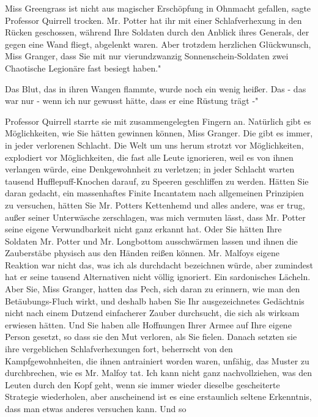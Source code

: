 \glqq Miss Greengrass ist nicht aus magischer Erschöpfung in Ohnmacht
gefallen\grqq{}, sagte Professor Quirrell trocken. \glqq Mr. Potter hat ihr mit
einer Schlafverhexung in den Rücken geschossen, während Ihre Soldaten durch den
Anblick ihres Generals, der gegen eine Wand fliegt, abgelenkt waren. Aber
trotzdem herzlichen Glückwunsch, Miss Granger, dass Sie mit nur vierundzwanzig
Sonnenschein-Soldaten zwei Chaotische Legionäre fast besiegt haben."

Das Blut, das in ihren Wangen flammte, wurde noch ein wenig heißer. \glqq Das -
das war nur - wenn ich nur gewusst hätte, dass er eine Rüstung trägt -"

Professor Quirrell starrte sie mit zusammengelegten Fingern an. \glqq Natürlich
gibt es Möglichkeiten, wie Sie hätten gewinnen können, Miss Granger. Die gibt es
immer, in jeder verlorenen Schlacht. Die Welt um uns herum strotzt vor
Möglichkeiten, explodiert vor Möglichkeiten, die fast alle Leute ignorieren,
weil es von ihnen verlangen würde, eine Denkgewohnheit zu verletzen; in jeder
Schlacht warten tausend Hufflepuff-Knochen darauf, zu Speeren geschliffen zu
werden. Hätten Sie daran gedacht, ein massenhaftes Finite Incantatem nach
allgemeinen Prinzipien zu versuchen, hätten Sie Mr. Potters Kettenhemd und alles
andere, was er trug, außer seiner Unterwäsche zerschlagen, was mich vermuten
lässt, dass Mr. Potter seine eigene Verwundbarkeit nicht ganz erkannt hat. Oder
Sie hätten Ihre Soldaten Mr. Potter und Mr. Longbottom ausschwärmen lassen und
ihnen die Zauberstäbe physisch aus den Händen reißen können. Mr. Malfoys eigene
Reaktion war nicht das, was ich als durchdacht bezeichnen würde, aber zumindest
hat er seine tausend Alternativen nicht völlig ignoriert.\grqq{} Ein
sardonisches Lächeln. \glqq Aber Sie, Miss Granger, hatten das Pech, sich daran
zu erinnern, wie man den Betäubungs-Fluch wirkt, und deshalb haben Sie Ihr
ausgezeichnetes Gedächtnis nicht nach einem Dutzend einfacherer Zauber
durchsucht, die sich als wirksam erwiesen hätten. Und Sie haben alle Hoffnungen
Ihrer Armee auf Ihre eigene Person gesetzt, so dass sie den Mut verloren, als
Sie fielen. Danach setzten sie ihre vergeblichen Schlafverhexungen fort,
beherrscht von den Kampfgewohnheiten, die ihnen antrainiert worden waren,
unfähig, das Muster zu durchbrechen, wie es Mr. Malfoy tat. Ich kann nicht ganz
nachvollziehen, was den Leuten durch den Kopf geht, wenn sie immer wieder
dieselbe gescheiterte Strategie wiederholen, aber anscheinend ist es eine
erstaunlich seltene Erkenntnis, dass man etwas anderes versuchen kann. Und so
